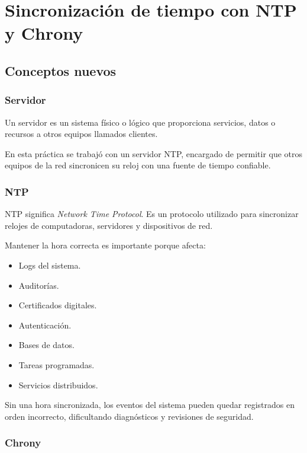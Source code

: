 \documentclass[11pt, letterpaper]{article}
\begin{document}
\newpage
\section{Sincronización de tiempo con NTP y Chrony}
\label{sec:org45a6d27}

\subsection{Conceptos nuevos}
\label{sec:orga5ae4cf}

\subsubsection{Servidor}
\label{sec:org0380202}

Un servidor es un sistema físico o lógico que proporciona servicios, datos o recursos a otros equipos llamados clientes.

En esta práctica se trabajó con un servidor NTP, encargado de permitir que otros equipos de la red sincronicen su reloj con una fuente de tiempo confiable.
\subsubsection{NTP}
\label{sec:org0ee3450}

NTP significa \emph{Network Time Protocol}. Es un protocolo utilizado para sincronizar relojes de computadoras, servidores y dispositivos de red.

Mantener la hora correcta es importante porque afecta:

\begin{itemize}
\item Logs del sistema.
\item Auditorías.
\item Certificados digitales.
\item Autenticación.
\item Bases de datos.
\item Tareas programadas.
\item Servicios distribuidos.
\end{itemize}

Sin una hora sincronizada, los eventos del sistema pueden quedar registrados en orden incorrecto, dificultando diagnósticos y revisiones de seguridad.
\subsubsection{Chrony}
\label{sec:org889a491}
\end{document}
